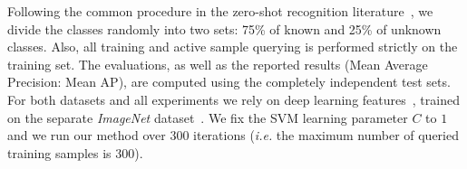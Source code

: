 \documentclass[10pt,twocolumn,letterpaper]{article}
\def\ie{\emph{i.e.}\xspace}
\begin{document}
Following the common procedure in the zero-shot recognition literature~\cite{akata13cvpr, MensinkCVPR2014}, we divide 
the classes randomly into two sets: 75\% of known and 25\% of unknown classes. Also, all training and active 
sample querying is performed strictly on the training set. The evaluations, as well as the reported results
(Mean Average Precision: Mean AP), are computed using the completely independent test sets.
For both datasets and all experiments we rely on deep learning features~\cite{KrizhevskySH12}, trained on 
the separate \textit{ImageNet} dataset~\cite{imagenet_cvpr09}. We fix the SVM learning parameter $C$
to $1$ and we run our method over 300 iterations (\ie the maximum number of queried training samples is 300).
\end{document}
